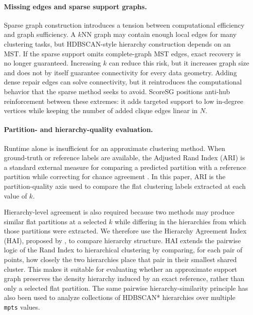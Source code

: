\documentclass[11pt]{article}
\begin{document}
\paragraph{Missing edges and sparse support graphs.}
Sparse graph construction introduces a tension between computational efficiency and graph sufficiency. A \(k\)NN graph may contain enough local edges for many clustering tasks, but HDBSCAN-style hierarchy construction depends on an MST. If the sparse support omits complete-graph MST edges, exact recovery is no longer guaranteed. Increasing \(k\) can reduce this risk, but it increases graph size and does not by itself guarantee connectivity for every data geometry. Adding dense repair edges can solve connectivity, but it reintroduces the computational behavior that the sparse method seeks to avoid. ScoreSG positions anti-hub reinforcement between these extremes: it adds targeted support to low in-degree vertices while keeping the number of added clique edges linear in \(N\).

\paragraph{Partition- and hierarchy-quality evaluation.}
Runtime alone is insufficient for an approximate clustering method. When ground-truth or reference labels are available, the Adjusted Rand Index (ARI) is a standard external measure for comparing a predicted partition with a reference partition while correcting for chance agreement \citep{hubert1985comparing}. In this paper, ARI is the partition-quality axis used to compare the flat clustering labels extracted at each value of \(k\).

Hierarchy-level agreement is also required because two methods may produce similar flat partitions at a selected \(k\) while differing in the hierarchies from which those partitions were extracted. We therefore use the Hierarchy Agreement Index (HAI), proposed by \citet{johnson2013comprehensive}, to compare hierarchy structure. HAI extends the pairwise logic of the Rand Index to hierarchical clustering by comparing, for each pair of points, how closely the two hierarchies place that pair in their smallest shared cluster. This makes it suitable for evaluating whether an approximate support graph preserves the density hierarchy induced by an exact reference, rather than only a selected flat partition. The same pairwise hierarchy-similarity principle has also been used to analyze collections of HDBSCAN* hierarchies over multiple \texttt{mpts} values.
\end{document}
